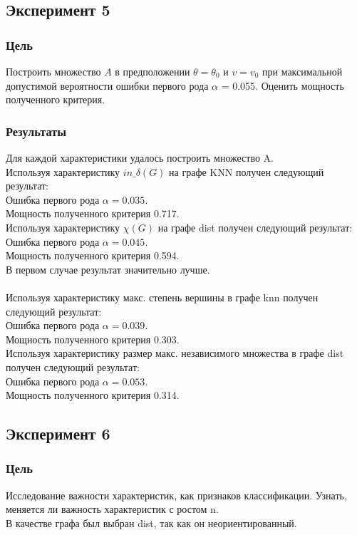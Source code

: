 \documentclass[a4paper, 12pt]{article}
\begin{document}
\subsection{Эксперимент 5}
\subsubsection{Цель}
Построить множество $A$ в предположении $\theta = \theta_0$ и $v = v_0$ при максимальной допустимой вероятности ошибки первого рода $\alpha$ = 0.055.
Оценить мощность полученного критерия.
\subsubsection{Результаты}
Для каждой характеристики удалось построить множество A.\\
Используя характеристику $in\_\delta(G)$ на графе KNN получен следующий результат:\\
Ошибка первого рода $\alpha = 0.035.$\\
Мощность полученного критерия 0.717.\\
Используя характеристику $\chi(G)$ на графе dist получен следующий результат:\\
Ошибка первого рода $\alpha = 0.045.$\\
Мощность полученного критерия 0.594.\\
В первом случае результат значительно лучше.\\

\\

Используя характеристику макс. степень вершины в графе knn получен следующий результат:\\
Ошибка первого рода $\alpha = 0.039.$\\
Мощность полученного критерия 0.303.\\

Используя характеристику размер макс. независимого множества в графе dist получен следующий результат:\\
Ошибка первого рода $\alpha = 0.053.$\\
Мощность полученного критерия 0.314.\\

\subsection{Эксперимент 6}
\subsubsection{Цель}
Исследование важности характеристик, как признаков классификации. Узнать, меняется ли важность характеристик с ростом n.\\
В качестве графа был выбран dist, так как он неориентированный.\\
\end{document}
